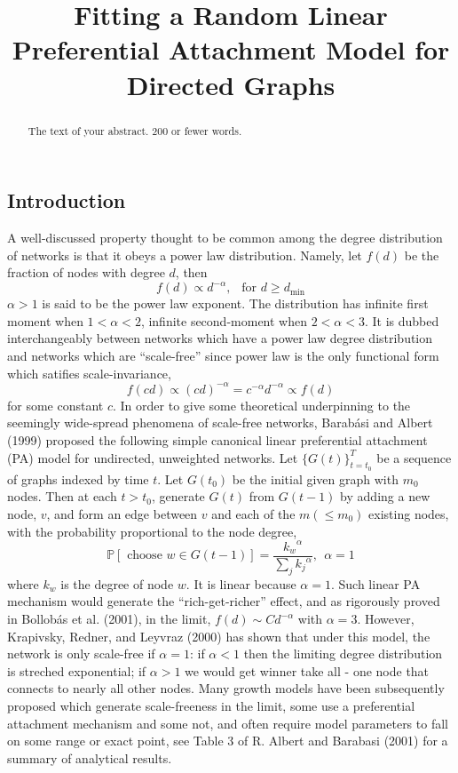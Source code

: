\documentclass[]{elsarticle} %
\begin{document}
\begin{frontmatter}

  \title{Fitting a Random Linear Preferential Attachment Model for Directed
Graphs}
    
  \begin{abstract}
  The text of your abstract. 200 or fewer words.
  \end{abstract}
  
 \end{frontmatter}

\subsection{Introduction}\label{introduction}

A well-discussed property thought to be common among the degree
distribution of networks is that it obeys a power law distribution.
Namely, let \(f(d)\) be the fraction of nodes with degree \(d\), then
\[f(d) \propto d^{-\alpha}, \ \  \text{ for } d \geq d_{\min}\]
\(\alpha > 1\) is said to be the power law exponent. The distribution
has infinite first moment when \(1 < \alpha < 2\), infinite
second-moment when \(2 < \alpha < 3\). It is dubbed interchangeably
between networks which have a power law degree distribution and networks
which are ``scale-free'' since power law is the only functional form
which satifies scale-invariance,
\[f(cd) \propto (cd)^{-\alpha} = c^{-\alpha}d^{-\alpha} \propto f(d)\]
for some constant \(c\). In order to give some theoretical underpinning
to the seemingly wide-spread phenomena of scale-free networks, Barabási
and Albert (1999) proposed the following simple canonical linear
preferential attachment (PA) model for undirected, unweighted networks.
Let \(\{G(t) \}_{t = t_0}^{T}\) be a sequence of graphs indexed by time
\(t\). Let \(G(t_0)\) be the initial given graph with \(m_0\) nodes.
Then at each \(t > t_0\), generate \(G(t)\) from \(G(t-1)\) by adding a
new node, \(v\), and form an edge between \(v\) and each of the
\(m (\leq m_0)\) existing nodes, with the probability proportional to
the node degree,
\[\mathbb{P}[\text{ choose }w \in G(t-1)] = \frac{{k_w}^{\alpha}}{\sum_j{ k_j}^\alpha}, \ \ \alpha = 1\]
where \(k_w\) is the degree of node \(w\). It is linear because
\(\alpha =1\). Such linear PA mechanism would generate the
``rich-get-richer'' effect, and as rigorously proved in Bollobás et al.
(2001), in the limit, \(f(d) \sim Cd^{-\alpha}\) with \(\alpha = 3\).
However, Krapivsky, Redner, and Leyvraz (2000) has shown that under this
model, the network is only scale-free if \(\alpha = 1\): if
\(\alpha < 1\) then the limiting degree distribution is streched
exponential; if \(\alpha > 1\) we would get winner take all - one node
that connects to nearly all other nodes. Many growth models have been
subsequently proposed which generate scale-freeness in the limit, some
use a preferential attachment mechanism and some not, and often require
model parameters to fall on some range or exact point, see Table 3 of R.
Albert and Barabasi (2001) for a summary of analytical results.
\end{document}
